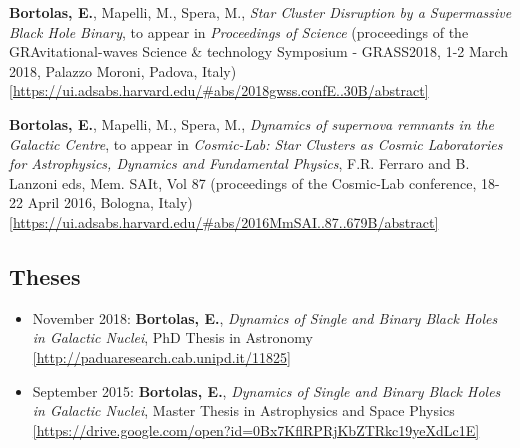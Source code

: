 \documentclass[11pt,a4paper]{article}
\begin{document}
\begin{etaremune}

\item {\bf Bortolas, E.}, Mapelli, M., Spera, M., {\it Star Cluster Disruption by a Supermassive Black Hole Binary}, to appear in {\it Proceedings of Science}  (proceedings of the  GRAvitational-waves Science \& technology Symposium - GRASS2018, 1-2 March 2018, Palazzo Moroni, Padova, Italy) \\ \href{https://ui.adsabs.harvard.edu/#abs/2018gwss.confE..30B/abstract}{\scriptsize [https://ui.adsabs.harvard.edu/\#abs/2018gwss.confE..30B/abstract]}




\item {\bf Bortolas, E.}, Mapelli, M., Spera, M., {\it Dynamics of supernova remnants in the Galactic Centre}, to appear in {\it Cosmic-Lab: Star Clusters as Cosmic Laboratories for Astrophysics, Dynamics and Fundamental Physics}, F.R. Ferraro and B. Lanzoni eds, Mem. SAIt, Vol 87 (proceedings of the Cosmic-Lab conference, 18-22 April 2016, Bologna, Italy)\\ \href{https://ui.adsabs.harvard.edu/#abs/2016MmSAI..87..679B/abstract}{\scriptsize [https://ui.adsabs.harvard.edu/\#abs/2016MmSAI..87..679B/abstract]}



\end{etaremune}

\subsection*{Theses}


\begin{itemize}
   \item {\normalfont November 2018:} {\bf Bortolas, E.}, {\it Dynamics of Single and Binary Black Holes in Galactic Nuclei}, PhD Thesis in Astronomy \href{http://paduaresearch.cab.unipd.it/11825}{\scriptsize [http://paduaresearch.cab.unipd.it/11825]}
  \item {\normalfont September 2015:} {\bf Bortolas, E.}, {\it Dynamics of Single and Binary Black Holes in Galactic Nuclei}, Master Thesis in Astrophysics and Space Physics \href{https://drive.google.com/open?id=0Bx7KflRPRjKbZTRkc19yeXdLc1E}{\scriptsize [https://drive.google.com/open?id=0Bx7KflRPRjKbZTRkc19yeXdLc1E]}
\end{itemize}
\end{document}
